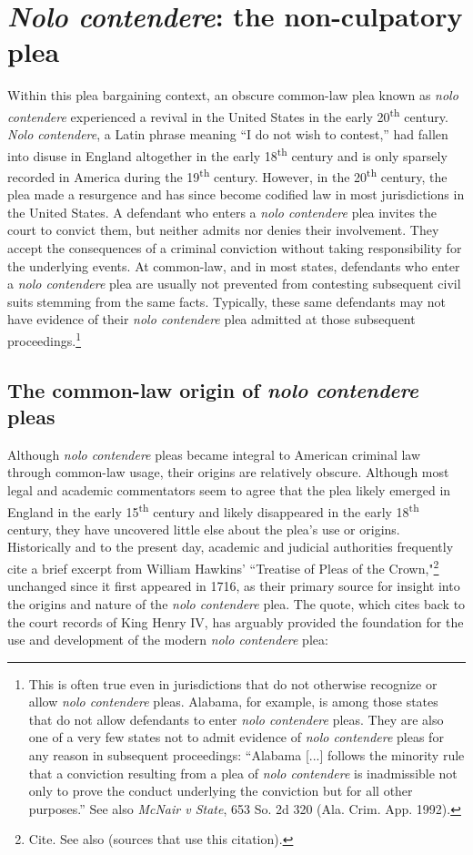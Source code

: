 \section{\textit{Nolo contendere}: the non-culpatory plea}

Within this plea bargaining context, an obscure common-law plea known as \textit{nolo contendere} experienced a revival in the United States in the early 20\textsuperscript{th} century. \textit{Nolo contendere}, a Latin phrase meaning ``I do not wish to contest,'' had fallen into disuse in England altogether in the early 18\textsuperscript{th} century and is only sparsely recorded in America during the 19\textsuperscript{th} century. However, in the 20\textsuperscript{th} century, the plea made a resurgence and has since become codified law in most jurisdictions in the United States. A defendant who enters a \textit{nolo contendere} plea invites the court to convict them, but neither admits nor denies their involvement. They accept the consequences of a criminal conviction without taking responsibility for the underlying events. At common-law, and in most states, defendants who enter a \textit{nolo contendere} plea are usually not prevented from contesting subsequent civil suits stemming from the same facts. Typically, these same defendants may not have evidence of their \textit{nolo contendere} plea admitted at those subsequent proceedings.\footnote{This is often true even in jurisdictions that do not otherwise recognize or allow \textit{nolo contendere} pleas. Alabama, for example, is among those states that do not allow defendants to enter \textit{nolo contendere} pleas. They are also one of a very few states not to admit evidence of \textit{nolo contendere} pleas for any reason in subsequent proceedings: ``Alabama [...] follows the minority rule that a conviction resulting from a plea of \textit{nolo contendere} is inadmissible not only to prove the conduct underlying the conviction but for all other purposes.” See also \textit{McNair v State}, 653 So. 2d 320 (Ala. Crim. App. 1992).}

\subsection{The common-law origin of \textit{nolo contendere} pleas}

Although \textit{nolo contendere} pleas became integral to American criminal law through common-law usage, their origins are relatively obscure. Although most legal and academic commentators seem to agree that the plea likely emerged in England in the early 15\textsuperscript{th} century and likely disappeared in the early 18\textsuperscript{th} century, they have uncovered little else about the plea's use or origins. Historically and to the present day, academic and judicial authorities frequently cite a brief excerpt from William Hawkins' ``Treatise of Pleas of the Crown,"\footnote{Cite. See also (sources that use this citation).} unchanged since it first appeared in 1716, as their primary source for insight into the origins and nature of the \textit{nolo contendere} plea. The quote, which cites back to the court records of King Henry IV, has arguably provided the foundation for the use and development of the modern \textit{nolo contendere} plea:

